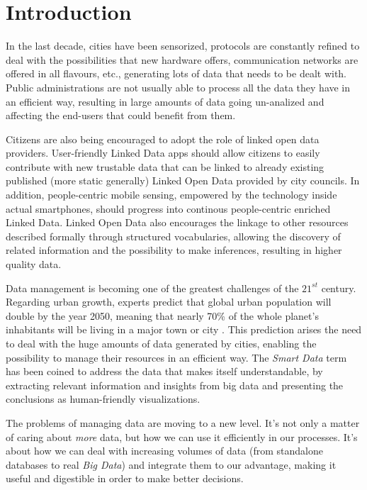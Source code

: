 \section{Introduction}
\label{sec:introduction}

In the last decade, cities have been sensorized, protocols are constantly refined to deal with the possibilities that new hardware offers, communication networks are offered in all flavours, etc., generating lots of data that needs to be dealt with. Public administrations are not usually able to process all the data they have in an efficient way, resulting in large amounts of data going un-analized and affecting the end-users that could benefit from them.

Citizens are also being encouraged to adopt the role of linked open data providers. User-friendly Linked Data apps should allow citizens to easily contribute with new trustable data that can be linked to already existing published (more static generally) Linked Open Data provided by city councils. In addition, people-centric mobile sensing, empowered by the technology inside actual smartphones, should progress into continous people-centric enriched Linked Data. Linked Open Data also encourages the linkage to other resources described formally through structured vocabularies, allowing the discovery of related information and the possibility to make inferences, resulting in higher quality data.

Data management is becoming one of the greatest challenges of the $21^{st}$ century. Regarding urban growth, experts predict that global urban population will double by the year 2050, meaning that nearly 70\% of the whole planet's inhabitants will be living in a major town or city \cite{city2010urbanization}. This prediction arises the need to deal with the huge amounts of data generated by cities, enabling the possibility to manage their resources in an efficient way. The \textit{Smart Data} term has been coined to address the data that makes itself understandable, by extracting relevant information and insights from big data and presenting the conclusions as human-friendly visualizations.

The problems of managing data are moving to a new level. It's not only a matter of caring about \textit{more} data, but how we can use it efficiently in our processes. It's about how we can deal with increasing volumes of data (from standalone databases to real \textit{Big Data}) and integrate them to our advantage, making it useful and digestible in order to make better decisions.


